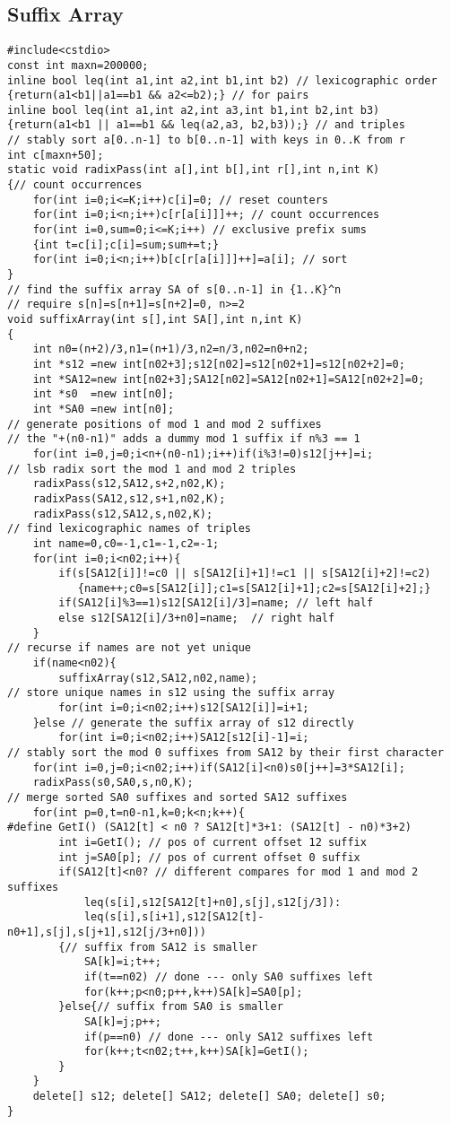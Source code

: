 \documentclass[9pt,a4paper,twocolumn,oneside]{article}
\begin{document}
\subsection{Suffix Array}
\begin{verbatim}
#include<cstdio>
const int maxn=200000;
inline bool leq(int a1,int a2,int b1,int b2) // lexicographic order
{return(a1<b1||a1==b1 && a2<=b2);} // for pairs
inline bool leq(int a1,int a2,int a3,int b1,int b2,int b3)
{return(a1<b1 || a1==b1 && leq(a2,a3, b2,b3));} // and triples
// stably sort a[0..n-1] to b[0..n-1] with keys in 0..K from r
int c[maxn+50];
static void radixPass(int a[],int b[],int r[],int n,int K)
{// count occurrences
    for(int i=0;i<=K;i++)c[i]=0; // reset counters
    for(int i=0;i<n;i++)c[r[a[i]]]++; // count occurrences
    for(int i=0,sum=0;i<=K;i++) // exclusive prefix sums
    {int t=c[i];c[i]=sum;sum+=t;}
    for(int i=0;i<n;i++)b[c[r[a[i]]]++]=a[i]; // sort
}
// find the suffix array SA of s[0..n-1] in {1..K}^n
// require s[n]=s[n+1]=s[n+2]=0, n>=2
void suffixArray(int s[],int SA[],int n,int K)
{
    int n0=(n+2)/3,n1=(n+1)/3,n2=n/3,n02=n0+n2;
    int *s12 =new int[n02+3];s12[n02]=s12[n02+1]=s12[n02+2]=0;
    int *SA12=new int[n02+3];SA12[n02]=SA12[n02+1]=SA12[n02+2]=0;
    int *s0  =new int[n0];
    int *SA0 =new int[n0];
// generate positions of mod 1 and mod 2 suffixes
// the "+(n0-n1)" adds a dummy mod 1 suffix if n%3 == 1
    for(int i=0,j=0;i<n+(n0-n1);i++)if(i%3!=0)s12[j++]=i;
// lsb radix sort the mod 1 and mod 2 triples
    radixPass(s12,SA12,s+2,n02,K);
    radixPass(SA12,s12,s+1,n02,K);
    radixPass(s12,SA12,s,n02,K);
// find lexicographic names of triples
    int name=0,c0=-1,c1=-1,c2=-1;
    for(int i=0;i<n02;i++){
        if(s[SA12[i]]!=c0 || s[SA12[i]+1]!=c1 || s[SA12[i]+2]!=c2)
           {name++;c0=s[SA12[i]];c1=s[SA12[i]+1];c2=s[SA12[i]+2];}
        if(SA12[i]%3==1)s12[SA12[i]/3]=name; // left half
        else s12[SA12[i]/3+n0]=name;  // right half
    }
// recurse if names are not yet unique
    if(name<n02){
        suffixArray(s12,SA12,n02,name);
// store unique names in s12 using the suffix array
        for(int i=0;i<n02;i++)s12[SA12[i]]=i+1;
    }else // generate the suffix array of s12 directly
        for(int i=0;i<n02;i++)SA12[s12[i]-1]=i;
// stably sort the mod 0 suffixes from SA12 by their first character
    for(int i=0,j=0;i<n02;i++)if(SA12[i]<n0)s0[j++]=3*SA12[i];
    radixPass(s0,SA0,s,n0,K);
// merge sorted SA0 suffixes and sorted SA12 suffixes
    for(int p=0,t=n0-n1,k=0;k<n;k++){
#define GetI() (SA12[t] < n0 ? SA12[t]*3+1: (SA12[t] - n0)*3+2)
        int i=GetI(); // pos of current offset 12 suffix
        int j=SA0[p]; // pos of current offset 0 suffix
        if(SA12[t]<n0? // different compares for mod 1 and mod 2 suffixes
            leq(s[i],s12[SA12[t]+n0],s[j],s12[j/3]):
            leq(s[i],s[i+1],s12[SA12[t]-n0+1],s[j],s[j+1],s12[j/3+n0]))
        {// suffix from SA12 is smaller
            SA[k]=i;t++;
            if(t==n02) // done --- only SA0 suffixes left
            for(k++;p<n0;p++,k++)SA[k]=SA0[p];
        }else{// suffix from SA0 is smaller
            SA[k]=j;p++;
            if(p==n0) // done --- only SA12 suffixes left
            for(k++;t<n02;t++,k++)SA[k]=GetI();
        }
    }
    delete[] s12; delete[] SA12; delete[] SA0; delete[] s0;
}


\end{verbatim}
\end{document}
